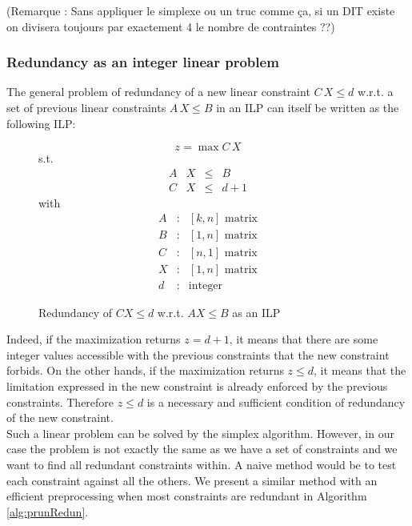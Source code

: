 \documentclass[times, 10pt,twocolumn, a4paper]{article}
\begin{document}
(Remarque : Sans appliquer le simplexe ou un truc comme ça, si un DIT existe on divisera toujours par exactement 4 le nombre de contraintes ??)

\subsubsection{Redundancy as an integer linear problem}

The general problem of redundancy of a new linear constraint $C \, X \leq d$ w.r.t. a set of previous linear constraints $A \, X \leq B$ in an ILP can itself be written as the following ILP:

\begin{figure}[h]
$$z = \max C \, X$$
s.t.
\[
\begin{array}{rccc}
	A & X &\leq & B \\
	C & X &\leq & d + 1
\end{array}
\]
with
\[
	\begin{array}{ccc}
		A & : & [k,n] \text{ matrix}\\
		B & : & [1,n] \text{ matrix}\\
		C & : & [n,1] \text{ matrix}\\
		X & : & [1,n] \text{ matrix}\\
		d & : & \text{integer}
	\end{array}
\]
\caption{Redundancy of $CX \leq d$ w.r.t. $A X \leq B$ as an ILP}
\end{figure}

Indeed, if the maximization returns $z=d+1$, it means that there are some integer values accessible with the previous constraints that the new constraint forbids. On the other hands, if the maximization returns $z \leq d$, it means that the limitation expressed in the new constraint is already enforced by the previous constraints. Therefore $z \leq d$ is a necessary and sufficient condition of redundancy of the new constraint.\\

Such a linear problem can be solved by the simplex algorithm. However, in our case the problem is not exactly the same as we have a set of constraints and we want to find all redundant constraints within. A naive method would be to test each constraint against all the others. We present a similar method with an efficient preprocessing when most constraints are redundant in Algorithm \ref{alg:prunRedun}.\\
\end{document}
